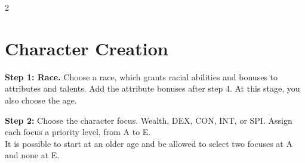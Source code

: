 \begin{multicols}{2}










\section{Character Creation}

\textbf{Step 1: Race.} Choose a race, which grants racial abilities and bonuses to attributes and talents. Add the attribute bonuses after step 4. At this stage, you also choose the age. 

\textbf{Step 2:} Choose the character focus. Wealth, DEX, CON, INT, or SPI. Assign each focus a priority level, from A to E. \\
It is possible to start at an older age and be allowed to select two focuses at A and none at E.


\end{multicols}

